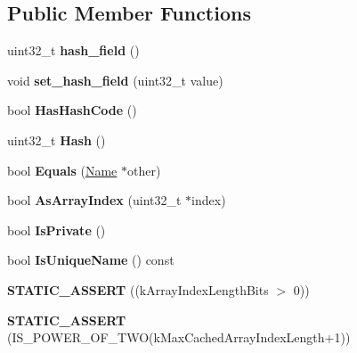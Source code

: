 \subsection*{Public Member Functions}
\begin{DoxyCompactItemize}
\item 
uint32\+\_\+t {\bfseries hash\+\_\+field} ()\hypertarget{classv8_1_1internal_1_1_name_ad61608b54af5cb01c5397ad55d911907}{}\label{classv8_1_1internal_1_1_name_ad61608b54af5cb01c5397ad55d911907}

\item 
void {\bfseries set\+\_\+hash\+\_\+field} (uint32\+\_\+t value)\hypertarget{classv8_1_1internal_1_1_name_a7143969e09bd27e1f6a60d50258686dd}{}\label{classv8_1_1internal_1_1_name_a7143969e09bd27e1f6a60d50258686dd}

\item 
bool {\bfseries Has\+Hash\+Code} ()\hypertarget{classv8_1_1internal_1_1_name_a2eee1d6ca54d3b718897f4de1249f1dd}{}\label{classv8_1_1internal_1_1_name_a2eee1d6ca54d3b718897f4de1249f1dd}

\item 
uint32\+\_\+t {\bfseries Hash} ()\hypertarget{classv8_1_1internal_1_1_name_a04a7a8b928966e664ad5788210327e36}{}\label{classv8_1_1internal_1_1_name_a04a7a8b928966e664ad5788210327e36}

\item 
bool {\bfseries Equals} (\hyperlink{classv8_1_1internal_1_1_name}{Name} $\ast$other)\hypertarget{classv8_1_1internal_1_1_name_aa375654cad6d51ae37d9ae5b5b358899}{}\label{classv8_1_1internal_1_1_name_aa375654cad6d51ae37d9ae5b5b358899}

\item 
bool {\bfseries As\+Array\+Index} (uint32\+\_\+t $\ast$index)\hypertarget{classv8_1_1internal_1_1_name_aafe9fecb286ed29037aecd56eb3f3124}{}\label{classv8_1_1internal_1_1_name_aafe9fecb286ed29037aecd56eb3f3124}

\item 
bool {\bfseries Is\+Private} ()\hypertarget{classv8_1_1internal_1_1_name_ad6e6b1942094491fe6b882deb2358487}{}\label{classv8_1_1internal_1_1_name_ad6e6b1942094491fe6b882deb2358487}

\item 
bool {\bfseries Is\+Unique\+Name} () const \hypertarget{classv8_1_1internal_1_1_name_a9f48b65310549820ff37b3263dc49659}{}\label{classv8_1_1internal_1_1_name_a9f48b65310549820ff37b3263dc49659}

\item 
{\bfseries S\+T\+A\+T\+I\+C\+\_\+\+A\+S\+S\+E\+RT} ((k\+Array\+Index\+Length\+Bits $>$ 0))\hypertarget{classv8_1_1internal_1_1_name_a93e25700aee0fa11ea167996757f771d}{}\label{classv8_1_1internal_1_1_name_a93e25700aee0fa11ea167996757f771d}

\item 
{\bfseries S\+T\+A\+T\+I\+C\+\_\+\+A\+S\+S\+E\+RT} (I\+S\+\_\+\+P\+O\+W\+E\+R\+\_\+\+O\+F\+\_\+\+T\+WO(k\+Max\+Cached\+Array\+Index\+Length+1))\hypertarget{classv8_1_1internal_1_1_name_a39f198a63ff3c994c28811b865151eaa}{}\label{classv8_1_1internal_1_1_name_a39f198a63ff3c994c28811b865151eaa}

\end{DoxyCompactItemize}
